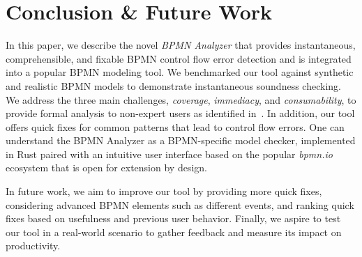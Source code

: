 \documentclass[onecolumn]{ceurart}
\begin{document}
\section{Conclusion \& Future Work} \label{sec:conclusion}

In this paper, we describe the novel \textit{BPMN Analyzer} that provides instantaneous, comprehensible, and fixable BPMN control flow error detection and is integrated into a popular BPMN modeling tool.
We benchmarked our tool against synthetic and realistic BPMN models to demonstrate instantaneous soundness checking.
We address the three main challenges, \textit{coverage}, \textit{immediacy}, and \textit{consumability}, to provide formal analysis to non-expert users as identified in~\cite{fahlandAnalysisDemandInstantaneous2011}.
In addition, our tool offers quick fixes for common patterns that lead to control flow errors.
One can understand the BPMN Analyzer as a BPMN-specific model checker, implemented in Rust paired with an intuitive user interface based on the popular \textit{bpmn.io} ecosystem that is open for extension by design.

In future work, we aim to improve our tool by providing more quick fixes, considering advanced BPMN elements such as different events, and ranking quick fixes based on usefulness and previous user behavior.
Finally, we aspire to test our tool in a real-world scenario to gather feedback and measure its impact on productivity.


\end{document}
